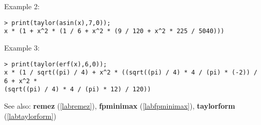 \noindent Example 2: 
\begin{center}\begin{minipage}{15cm}\begin{Verbatim}[frame=single]
> print(taylor(asin(x),7,0));
x * (1 + x^2 * (1 / 6 + x^2 * (9 / 120 + x^2 * 225 / 5040)))
\end{Verbatim}
\end{minipage}\end{center}
\noindent Example 3: 
\begin{center}\begin{minipage}{15cm}\begin{Verbatim}[frame=single]
> print(taylor(erf(x),6,0));
x * (1 / sqrt((pi) / 4) + x^2 * ((sqrt((pi) / 4) * 4 / (pi) * (-2)) / 6 + x^2 * 
(sqrt((pi) / 4) * 4 / (pi) * 12) / 120))
\end{Verbatim}
\end{minipage}\end{center}
See also: \textbf{remez} (\ref{labremez}), \textbf{fpminimax} (\ref{labfpminimax}), \textbf{taylorform} (\ref{labtaylorform})
